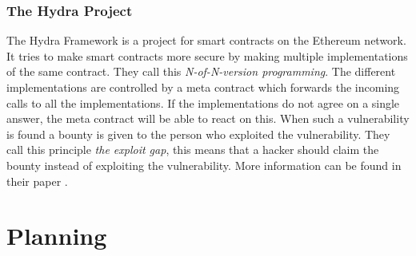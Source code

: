 \documentclass[a4paper]{article}
\begin{document}
\subsubsection{The Hydra Project}
The Hydra Framework is a project for smart contracts on the Ethereum network. It tries to make smart contracts more secure by making multiple implementations of the same contract. They call this \textit{N-of-N-version programming}. The different implementations are controlled by a meta contract which forwards the incoming calls to all the implementations. If the implementations do not agree on a single answer, the meta contract will be able to react on this. When such a vulnerability is found a bounty is given to the person who exploited the vulnerability. They call this principle \textit{the exploit gap}, this means that a hacker should claim the bounty instead of exploiting the vulnerability. More information can be found in their paper \cite{breidenbachenter}. 





\section{Planning}





\end{document}
